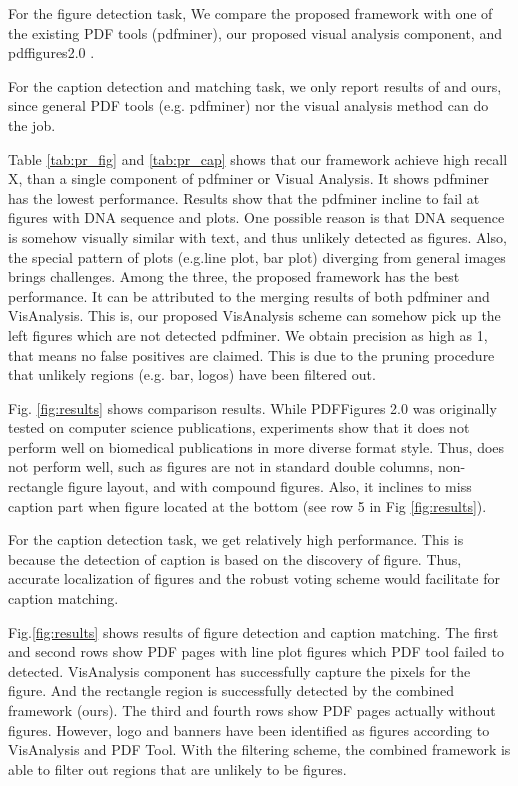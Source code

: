 \documentclass{article}
\begin{document}
For the figure detection task, We compare the proposed framework with one of the existing PDF tools (pdfminer), our proposed visual analysis component, and pdffigures2.0 \cite{clark2016pdffigures}. 

For the caption detection and matching task, we only report results of \cite{clark2016pdffigures} and ours, since general PDF tools (e.g. pdfminer) nor the visual analysis method can do the job. 

Table \ref{tab:pr_fig} and \ref{tab:pr_cap} shows that our framework achieve high recall {\color{blue}X}, than a single component of pdfminer or Visual Analysis. It shows pdfminer has the lowest performance. Results show that the pdfminer incline to fail at figures with DNA sequence and plots. One possible reason is that DNA sequence is somehow visually similar with text, and thus unlikely detected as figures. Also, the special pattern of plots (e.g.line plot, bar plot) diverging from general images brings challenges. Among the three, the proposed framework has the best performance. It can be attributed to the merging results of both pdfminer and VisAnalysis. This is, our proposed VisAnalysis scheme can somehow pick up the left figures which are not detected pdfminer. 
We obtain precision as high as 1, that means no false positives are claimed. This is due to the pruning procedure that unlikely regions (e.g. bar, logos) have been filtered out.

Fig. \ref{fig:results} shows comparison results. While PDFFigures 2.0 \cite{clark2016pdffigures} was originally tested on computer science publications, experiments show that it does not perform well on biomedical publications in more diverse format style. Thus, \cite{clark2016pdffigures} does not perform well, such as figures are not in standard double columns, non-rectangle figure layout, and with compound figures. Also, it inclines to miss caption part when figure located at the bottom (see row 5 in Fig \ref{fig:results}).

For the caption detection task, we get relatively high performance. 
This is because the detection of caption is based on the discovery of figure. Thus, accurate localization of figures and the robust voting scheme would facilitate for caption matching. 

Fig.\ref{fig:results} shows results of figure detection and caption matching. 
The first and second rows show PDF pages with line plot figures which PDF tool failed to detected. VisAnalysis component has successfully capture the pixels for the figure. And the rectangle region is successfully detected by the combined framework (ours). 
The third and fourth rows show PDF pages actually without figures. However, logo and banners have been identified as figures according to VisAnalysis and PDF Tool. With the filtering scheme, the combined framework is able to filter out regions that are unlikely to be figures.
\end{document}
